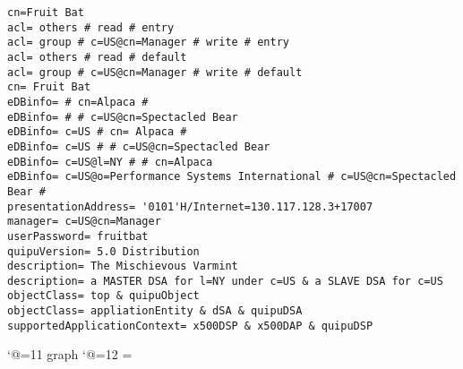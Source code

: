 
\smaller
\begin{verbatim}
cn=Fruit Bat
acl= others # read # entry
acl= group # c=US@cn=Manager # write # entry
acl= others # read # default
acl= group # c=US@cn=Manager # write # default
cn= Fruit Bat
eDBinfo= # cn=Alpaca #
eDBinfo= # # c=US@cn=Spectacled Bear
eDBinfo= c=US # cn= Alpaca # 
eDBinfo= c=US # # c=US@cn=Spectacled Bear
eDBinfo= c=US@l=NY # # cn=Alpaca
eDBinfo= c=US@o=Performance Systems International # c=US@cn=Spectacled Bear #
presentationAddress= '0101'H/Internet=130.117.128.3+17007
manager= c=US@cn=Manager
userPassword= fruitbat
quipuVersion= 5.0 Distribution
description= The Mischievous Varmint
description= a MASTER DSA for l=NY under c=US & a SLAVE DSA for c=US
objectClass= top & quipuObject
objectClass= appliationEntity & dSA & quipuDSA
supportedApplicationContext= x500DSP & x500DAP & quipuDSP

\end{verbatim}

\catcode`@=11
\expandafter\ifx\csname graph\endcsname\relax {}\box\chardef\insc@unt\graph\fi
\catcode`@=12
\setbox\graph=\empty
